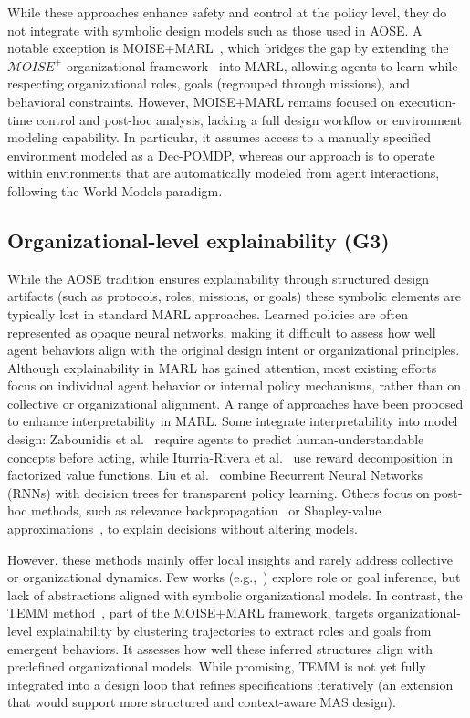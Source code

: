 \documentclass[pdflatex,sn-mathphys-num]{sn-jnl}%
\theoremstyle{thmstyleone}%
\theoremstyle{thmstyletwo}%
\theoremstyle{thmstylethree}%
\begin{document}
While these approaches enhance safety and control at the policy level, they do not integrate with symbolic design models such as those used in AOSE. A notable exception is MOISE+MARL~\cite{soule2025moisemarl}, which bridges the gap by extending the $\mathcal{M}OISE^+$ organizational framework~\cite{Hubner2002} into MARL, allowing agents to learn while respecting organizational roles, goals (regrouped through missions), and behavioral constraints. However, MOISE+MARL remains focused on execution-time control and post-hoc analysis, lacking a full design workflow or environment modeling capability. In particular, it assumes access to a manually specified environment modeled as a Dec-POMDP, whereas our approach is to operate within environments that are automatically modeled from agent interactions, following the World Models paradigm.

\subsection{Organizational-level explainability (G3)}

While the AOSE tradition ensures explainability through structured design artifacts (such as protocols, roles, missions, or goals) these symbolic elements are typically lost in standard MARL approaches. Learned policies are often represented as opaque neural networks, making it difficult to assess how well agent behaviors align with the original design intent or organizational principles. Although explainability in MARL has gained attention, most existing efforts focus on individual agent behavior or internal policy mechanisms, rather than on collective or organizational alignment.
A range of approaches have been proposed to enhance interpretability in MARL. Some integrate interpretability into model design: Zabounidis et al.~\cite{zabounidis2023concept} require agents to predict human-understandable concepts before acting, while Iturria-Rivera et al.~\cite{iturria2024explainable} use reward decomposition in factorized value functions. Liu et al.~\cite{liu2025} combine Recurrent Neural Networks (RNNs) with decision trees for transparent policy learning. Others focus on post-hoc methods, such as relevance backpropagation~\cite{poupart2025perspectives} or Shapley-value approximations~\cite{li2025from}, to explain decisions without altering models.

However, these methods mainly offer local insights and rarely address collective or organizational dynamics. Few works (e.g.,~\cite{berenji2000learning,yusuf2020inferential,serrino2019finding}) explore role or goal inference, but lack of abstractions aligned with symbolic organizational models. In contrast, the TEMM method~\cite{soule2025moisemarl}, part of the MOISE+MARL framework, targets organizational-level explainability by clustering trajectories to extract roles and goals from emergent behaviors. It assesses how well these inferred structures align with predefined organizational models. While promising, TEMM is not yet fully integrated into a design loop that refines specifications iteratively (an extension that would support more structured and context-aware MAS design).
\end{document}
